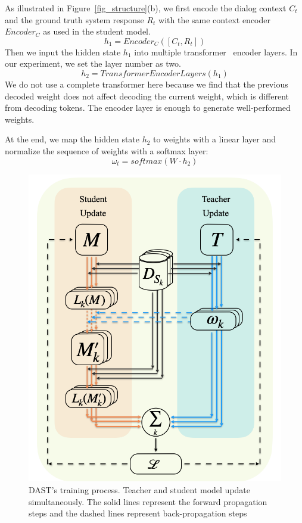\documentclass[letterpaper]{article} %
\begin{document}
As illustrated in Figure~\ref{fig_structure}(b), we first encode the dialog context $C_t$ and the ground truth system response $R_t$ with the same context encoder $Encoder_C$ as used in the student model.
$$h_1=Encoder_C([C_t,R_t])$$
Then we input the hidden state $h_1$ into multiple transformer~\citep{vaswani2017attention} encoder layers. In our experiment, we set the layer number as two.
$$h_2=TransformerEncoderLayers(h_1)$$
We do not use a complete transformer here because we find that the previous decoded weight does not affect decoding the current weight, which is different from decoding tokens. The encoder layer is enough to generate well-performed weights.

At the end, we map the hidden state $h_2$ to weights with a linear layer and normalize the sequence of weights with a softmax layer:
$$\omega_t= softmax(W\cdot h_2)$$


                            \begin{figure}
                            \centering
                            \includegraphics[width=0.95\columnwidth]{figs/train0.png}
                            \caption{DAST's training process. Teacher and student model update simultaneously. The solid lines represent the forward propagation steps and the dashed lines represent back-propagation steps}
                            \label{fig_train}
                            \end{figure}
\end{document}
